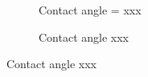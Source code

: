 \documentclass{article}
\begin{document}
 \begin{figure}[h!]
 	\centering
 	\begin{subfigure}[h!]{3cm}
 		\caption{Contact angle = xxx}
 	\end{subfigure}
 	\begin{subfigure}[h!]{2cm}            
 		\caption{Contact angle xxx}
 		\label{Fig:Datsa3}
 	\end{subfigure}
 	

\end{figure}
\end{document}
